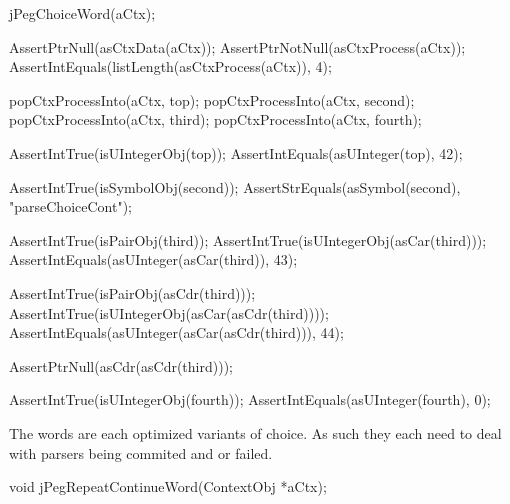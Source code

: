   jPegChoiceWord(aCtx);
  
  AssertPtrNull(asCtxData(aCtx));
  AssertPtrNotNull(asCtxProcess(aCtx));
  AssertIntEquals(listLength(asCtxProcess(aCtx)), 4);
  
  popCtxProcessInto(aCtx, top);
  popCtxProcessInto(aCtx, second);
  popCtxProcessInto(aCtx, third);
  popCtxProcessInto(aCtx, fourth);
  
  AssertIntTrue(isUIntegerObj(top));
  AssertIntEquals(asUInteger(top), 42);    

  AssertIntTrue(isSymbolObj(second));
  AssertStrEquals(asSymbol(second), "parseChoiceCont");
  
  AssertIntTrue(isPairObj(third));
  AssertIntTrue(isUIntegerObj(asCar(third)));
  AssertIntEquals(asUInteger(asCar(third)), 43);
  
  AssertIntTrue(isPairObj(asCdr(third)));
  AssertIntTrue(isUIntegerObj(asCar(asCdr(third))));
  AssertIntEquals(asUInteger(asCar(asCdr(third))), 44);
  
  AssertPtrNull(asCdr(asCdr(third)));
  
  AssertIntTrue(isUIntegerObj(fourth));
  AssertIntEquals(asUInteger(fourth), 0);
\stopCTest
\stopTestCase
\stopTestSuite

The  words are each optimized variants of 
choice. As such they each need to deal with parsers being commited and or 
failed. 

\startTestSuite[jPegRepeatContinueWord]

\startCHeader
void jPegRepeatContinueWord(ContextObj *aCtx);
\stopCHeader

